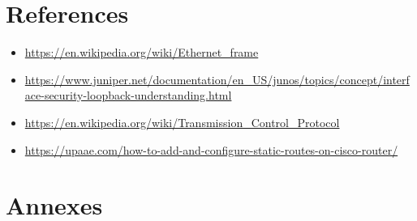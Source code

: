 \documentclass[11pt]{report}
\begin{document}
{\let\clearpage\relax\chapter{References}}
\begin{itemize}
  \item \url{https://en.wikipedia.org/wiki/Ethernet_frame}
  \item \url{https://www.juniper.net/documentation/en_US/junos/topics/concept/interface-security-loopback-understanding.html}
  \item \url{https://en.wikipedia.org/wiki/Transmission_Control_Protocol}
  \item \url{https://upaae.com/how-to-add-and-configure-static-routes-on-cisco-router/}
\end{itemize}

\chapter{Annexes}
\end{document}
